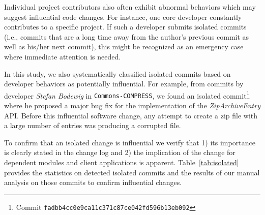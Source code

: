 



Individual project contributors also often exhibit abnormal
behaviors which may suggest influential code changes.
For instance, one core developer constantly contributes
 to a specific project. If such a developer
submits isolated commits (i.e., commits that are a long time away from
the author's previous commit as well as his/her next commit), this
might be recognized as an emergency case where immediate attention is needed. 

In this study, we also systematically classified isolated commits based on
developer behaviors as potentially influential. For example, from commits by
developer {\em Stefan Bodewig} in {\tt Commons-COMPRESS}, we found an isolated
commit\footnote{Commit \tt\small fadbb4cc0e9ca11c371c87ce042fd596b13eb092}
where he proposed a major bug fix for the implementation of the {\em
ZipArchiveEntry} API. Before this influential software change, any attempt to create a
zip file with a large number of entries was producing a corrupted file.





To confirm that an isolated change is influential we verify that 1) its importance is clearly stated in the change log and
2) the implication of the change for dependent modules and client applications is apparent.
Table~\ref{tab:isolated} provides the statistics on detected isolated commits
and the results of our manual analysis on those  commits to confirm influential changes.


